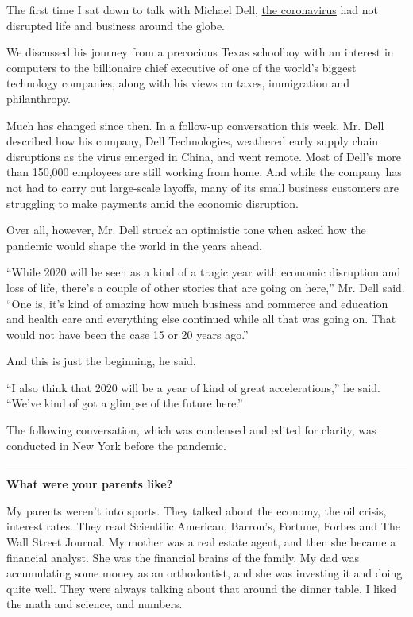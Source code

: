 The first time I sat down to talk with Michael Dell,
\href{https://www.nytimes3xbfgragh.onion/news-event/coronavirus}{the
coronavirus} had not disrupted life and business around the globe.

We discussed his journey from a precocious Texas schoolboy with an
interest in computers to the billionaire chief executive of one of the
world's biggest technology companies, along with his views on taxes,
immigration and philanthropy.

Much has changed since then. In a follow-up conversation this week, Mr.
Dell described how his company, Dell Technologies, weathered early
supply chain disruptions as the virus emerged in China, and went remote.
Most of Dell's more than 150,000 employees are still working from home.
And while the company has not had to carry out large-scale layoffs, many
of its small business customers are struggling to make payments amid the
economic disruption.

Over all, however, Mr. Dell struck an optimistic tone when asked how the
pandemic would shape the world in the years ahead.

``While 2020 will be seen as a kind of a tragic year with economic
disruption and loss of life, there's a couple of other stories that are
going on here,'' Mr. Dell said. ``One is, it's kind of amazing how much
business and commerce and education and health care and everything else
continued while all that was going on. That would not have been the case
15 or 20 years ago.''

And this is just the beginning, he said.

``I also think that 2020 will be a year of kind of great
accelerations,'' he said. ``We've kind of got a glimpse of the future
here.''

The following conversation, which was condensed and edited for clarity,
was conducted in New York before the pandemic.

\begin{center}\rule{0.5\linewidth}{\linethickness}\end{center}

\textbf{What were your parents like?}

My parents weren't into sports. They talked about the economy, the oil
crisis, interest rates. They read Scientific American, Barron's,
Fortune, Forbes and The Wall Street Journal. My mother was a real estate
agent, and then she became a financial analyst. She was the financial
brains of the family. My dad was accumulating some money as an
orthodontist, and she was investing it and doing quite well. They were
always talking about that around the dinner table. I liked the math and
science, and numbers.

